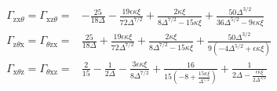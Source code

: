 \documentclass[books,12pt]{elegantpaper}
\newcommand{\bgn}{\begin{align}}
\begin{document}
$$ \bgn
\Gamma _{\text{zx$\theta $}}=\Gamma _{\text{xz$\theta $}}=& -\frac{25}{18 \Delta }-\frac{19 \epsilon  \kappa  \xi }{72 \Delta ^{7/2}}+\frac{2 \kappa  \xi }{8 \Delta ^{7/2}-15 \kappa  \xi }+\frac{50 \Delta ^{3/2}}{36 \Delta ^{5/2}-9 \epsilon  \kappa  \xi } \\
\Gamma _{\text{z$\theta $x}}=\Gamma _{\text{$\theta $zx}}=& \frac{25}{18 \Delta }+\frac{19 \epsilon  \kappa  \xi }{72 \Delta ^{7/2}}+\frac{2 \kappa  \xi }{8 \Delta ^{7/2}-15 \kappa  \xi }+\frac{50 \Delta ^{3/2}}{9 \left(-4 \Delta ^{5/2}+\epsilon  \kappa  \xi \right)} \\
\Gamma _{\text{x$\theta $z}}=\Gamma _{\text{$\theta $xz}}=& \frac{2}{15}-\frac{1}{2 \Delta }-\frac{3 \epsilon  \kappa  \xi }{8 \Delta ^{7/2}}+\frac{16}{15 \left(-8+\frac{15 \kappa  \xi }{\Delta^{7/2}}\right)}+\frac{1}{2 \Delta -\frac{\epsilon  \kappa  \xi }{2 \Delta ^{3/2}}}
\end{align} $$

\nocite{EINAV2010,Havrylchyk2018} 



\end{document}
